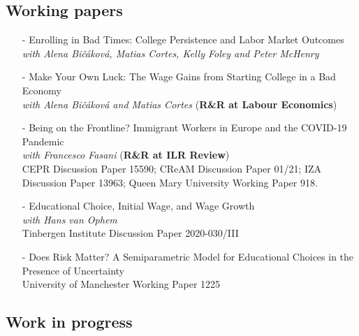 \documentclass[11pt]{article}
\begin{document}
\nocite{christl_et_al-fs}
\nocite{mazza_scipioni_jepp}
\nocite{bicakova_cortes_mazza_ej}
\nocite{mazza_vohpem_hartog_le}
\nocite{mazza_vophem_jrssa}

\hspace*{20pt}%
\begin{minipage}[t]{0.9\textwidth}%
\vspace{-.9cm}
    \centering
    \renewcommand\refname{}
        
        
\end{minipage}

\vspace{-.3cm}

\subsection*{\sc Working papers}

\begin{itemize}[itemsep=0pt, leftmargin=20pt]
\item[-]{Enrolling in Bad Times: College Persistence and Labor Market Outcomes}\\
	\emph{with Alena Bi\v{c}\'{a}kov\'{a}, Matias Cortes, Kelly Foley and Peter McHenry} 
\item [-]{Make Your Own Luck: The Wage Gains from Starting College in a Bad Economy}\\
\emph{with Alena Bi\v{c}\'{a}kov\'{a} and Matias Cortes} (\textbf{R\&R at Labour Economics})
\item [-]Being on the Frontline? Immigrant Workers in Europe and the COVID-19 Pandemic\\
\emph{with Francesco Fasani} (\textbf{R\&R at ILR Review})\\
CEPR Discussion Paper 15590; CReAM Discussion Paper 01/21; IZA Discussion Paper 13963; Queen Mary University Working Paper 918.
\item [-]Educational Choice, Initial Wage, and Wage Growth\\
\emph{with Hans van Ophem}\\
Tinbergen Institute Discussion Paper 2020-030/III
\item [-]Does Risk Matter? A Semiparametric Model for Educational Choices in the Presence of Uncertainty \\
University of Manchester Working Paper 1225

\end{itemize}

\subsection*{\sc Work in progress}
\end{document}

